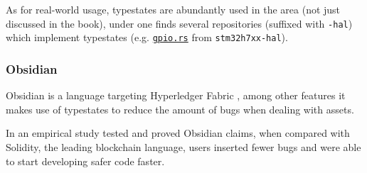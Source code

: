 As for real-world usage, typestates are abundantly used in the area (not just discussed in the book),
under \autocite{Stm32} one finds several repositories (suffixed with \texttt{-hal})
which implement typestates
(e.g. \href{https://github.com/stm32-rs/stm32h7xx-hal/blob/master/src/gpio.rs#L51-L128}{\texttt{gpio.rs}}
from \texttt{stm32h7xx-hal}).

\subsubsection*{Obsidian}

Obsidian is a language targeting Hyperledger Fabric \autocite{Fabric2021},
among other features it makes use of typestates to reduce the amount of bugs when dealing with assets.

In \autocite{Coblenz2020} an empirical study tested and proved Obsidian claims,
when compared with Solidity, the leading blockchain language,
users inserted fewer bugs and were able to start developing safer code faster.









